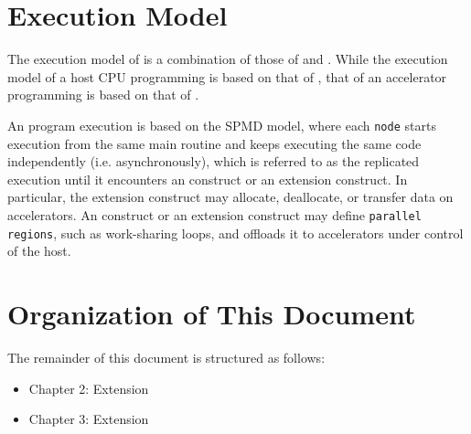 \section{Execution Model}
The execution model of {\XACC} is a combination of those of {\XMP} and {\OACC}.
While the execution model of a host CPU programming is based on that of {\XMP},
that of an accelerator programming is based on that of {\OACC}.

An {\XACC} program execution is based on the SPMD model, 
where each {\tt node} starts execution from the same main routine and keeps executing the same code independently (i.e. asynchronously), 
which is referred to as the replicated execution
until it encounters an {\XMP} construct or an {\XMP} extension construct.
In particular,
the {\XMP} extension construct may allocate, deallocate, or transfer data on accelerators.
An {\OACC} construct or an {\OACC} extension construct may define {\tt parallel regions}, such as work-sharing loops, 
and offloads it to accelerators under control of the host.

\section{Organization of This Document}
The remainder of this document is structured as follows:

\begin{itemize}
 \item Chapter 2: {\OACC} Extension
 \item Chapter 3: {\XMP} Extension
\end{itemize}

